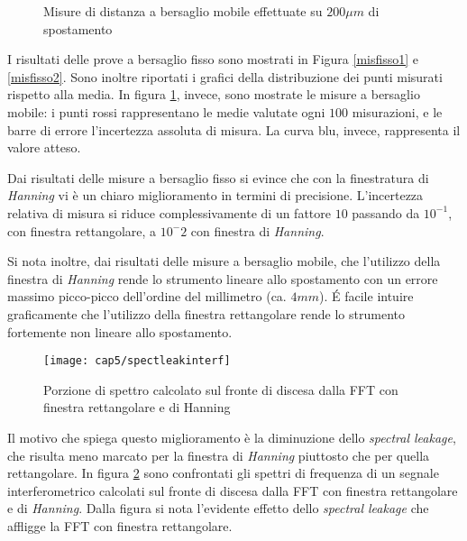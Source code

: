 \begin{figure}
\centering
{}
\hspace{5mm}
\caption{Misure di distanza a bersaglio mobile effettuate su $200 \mu m$ di spostamento}\label{mismobile12}
\end{figure}

I risultati delle prove a bersaglio fisso sono mostrati in Figura \ref{misfisso1} e \ref{misfisso2}. Sono inoltre riportati i grafici della distribuzione dei punti misurati rispetto alla media. In figura \ref{mismobile12}, invece, sono mostrate le misure a bersaglio mobile: i punti rossi rappresentano le medie valutate ogni $100$ misurazioni, e le barre di errore l'incertezza assoluta di misura. La curva blu, invece, rappresenta il valore atteso.

Dai risultati delle misure a bersaglio fisso si evince che con la finestratura di \textit{Hanning} vi è un chiaro miglioramento in termini di precisione. L'incertezza relativa di misura si riduce complessivamente di un fattore $10$ passando da $10^{-1}$, con finestra rettangolare, a $10^{-}2$ con finestra di \textit{Hanning}.

Si nota inoltre, dai risultati delle misure a bersaglio mobile, che l'utilizzo della finestra di \textit{Hanning} rende lo strumento lineare allo spostamento con un errore massimo picco-picco dell'ordine del millimetro (ca. $4mm$). \'E facile intuire graficamente che l'utilizzo della finestra rettangolare rende lo strumento fortemente non lineare allo spostamento.
\begin{figure}  
  \begin{center}
    \texttt{[image: cap5/spectleakinterf]}
    \caption{Porzione di spettro calcolato sul fronte di discesa dalla FFT con finestra rettangolare e di Hanning}
    \label{spectleakinterf}
  \end{center}
\end{figure}

Il motivo che spiega questo miglioramento è la diminuzione dello \textit{spectral leakage}, che risulta meno marcato per la finestra di \textit{Hanning} piuttosto che per quella rettangolare. In figura \ref{spectleakinterf} sono confrontati gli spettri di frequenza di un segnale interferometrico calcolati sul fronte di discesa dalla FFT con finestra rettangolare e di \textit{Hanning}. Dalla figura si nota l'evidente effetto dello \textit{spectral leakage} che affligge la FFT con finestra rettangolare.

